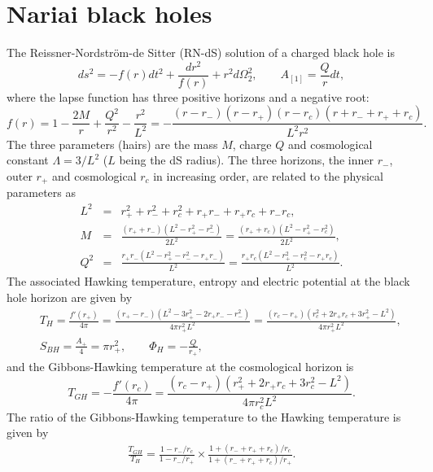 \documentclass[aps,nofootinbib,superscriptaddress
]{revtex4}
\begin{document}
\section{Nariai black holes} \label{sec II}
The Reissner-Nordstr{\"o}m-de Sitter (RN-dS) solution of a charged black hole is
\begin{equation} \label{eq_RNdS}
ds^2 = - f(r) dt^2 + \frac{dr^2}{f(r)} + r^2 d\Omega_2^2, \qquad A_{[1]} = \frac{Q}{r} dt,
\end{equation}
where the lapse function has three positive horizons and a negative root:
\begin{equation}
f(r) = 1 - \frac{2 M}{r} + \frac{Q^2}{r^2} - \frac{r^2}{L^2} = - \frac{(r - r_-) (r - r_+) (r - r_c) (r + r_- + r_+ + r_c)}{L^2 r^2}.
\end{equation}
The three parameters (hairs) are the mass $M$, charge $Q$ and cosmological constant $\Lambda = 3/L^2$ ($L$ being the dS radius). The three horizons, the inner $r_-$, outer $r_+$ and cosmological $r_c$ in increasing order, are related to the physical parameters as
\begin{eqnarray}
L^2 &=& r_+^2 + r_-^2 + r_c^2 + r_+ r_- + r_+ r_c + r_- r_c,
\\
M &=& \frac{(r_+ + r_-) (L^2 - r_+^2 - r_-^2)}{2 L^2} = \frac{(r_+ + r_c) (L^2 - r_+^2 - r_c^2)}{2 L^2},
\\
Q^2 &=& \frac{r_+ r_- (L^2 - r_+^2 - r_-^2 - r_+ r_-)}{L^2} = \frac{r_+ r_c (L^2 - r_+^2 - r_c^2 - r_+ r_c)}{L^2}.
\end{eqnarray}
The associated Hawking temperature, entropy and electric potential at the black hole horizon are given by
\begin{eqnarray}
&& T_H = \frac{f'(r_+)}{4 \pi} = \frac{(r_+ - r_-) (L^2 - 3 r_+^2 - 2 r_+ r_- - r_-^2)}{4 \pi r_+^2 L^2} = \frac{(r_c - r_+) (r_c^2 + 2 r_+ r_c + 3 r_+^2 - L^2)}{4 \pi r_+^2 L^2},
\nonumber\\
&& S_{BH} = \frac{A_+}4 = \pi r_+^2, \qquad \Phi_H = - \frac{Q}{r_+},
\end{eqnarray}
and the Gibbons-Hawking temperature at the cosmological horizon is
\begin{equation}
T_{GH} = -\frac{f'(r_c)}{4 \pi} = \frac{(r_c - r_+) (r_+^2 + 2 r_+ r_c + 3 r_c^2 - L^2)}{4 \pi r_c^2 L^2}.
\end{equation}
The ratio of the Gibbons-Hawking temperature to the Hawking temperature is given by
\begin{eqnarray}
\frac{T_{GH}}{T_H} = \frac{1 - r_-/r_c}{1 - r_-/r_+} \times \frac{1 + (r_- + r_+ + r_c)/r_c}{1 + (r_- + r_+ + r_c)/r_+}.
\end{eqnarray}
\end{document}
